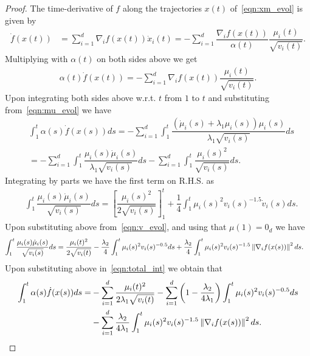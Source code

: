 \begin{proof}

The time-derivative of $f$ along the trajectories $x(t)$  of~\eqref{eqn:xm_evol} is given by
\begin{align*}
    \Dot{f}(x(t)) &= \sum_{i=1}^d \nabla_i f(x(t)) \Dot{x}_{i}(t) = - \sum_{i=1}^d \dfrac{\nabla_i f(x(t))}{\alpha(t)} \dfrac{\mu_i(t)}{\sqrt{v_i(t)}}.
\end{align*}
Multiplying with $\alpha(t)$ on both sides above we get
\begin{align*}
    \alpha(t)\Dot{f}(x(t)) = - \sum_{i=1}^d \nabla_i f(x(t)) \dfrac{\mu_i(t)}{\sqrt{v_i(t)}}.
\end{align*}
Upon integrating both sides above w.r.t. $t$ from $1$ to $t$ and substituting from~\eqref{eqn:mu_evol} we have
\begin{align}
    & \int_1^t \alpha(s)\Dot{f}(x(s))ds = - \sum_{i=1}^d \int_1^t \dfrac{(\Dot{\mu}_i(s) + \lambda_1 \mu_i(s)) \mu_i(s)}{\lambda_1 \sqrt{v_i(s)}}ds \nonumber\\
    &= - \sum_{i=1}^d \int_1^t \dfrac{\mu_i(s)\Dot{\mu}_i(s)}{\lambda_1 \sqrt{v_i(s)}}ds - \sum_{i=1}^d \int_1^t \dfrac{\mu_i(s)^2}{\sqrt{v_i(s)}}ds. \label{eqn:total_int}
\end{align}
Integrating by parts we have the first term on R.H.S. as
\begin{align*}
    & \int_1^t \dfrac{\mu_i(s)\Dot{\mu}_i(s)}{\sqrt{v_i(s)}}ds
    = \left[\dfrac{\mu_i(s)^2}{2\sqrt{v_i(s)}}\right]_1^t + \dfrac{1}{4} \int_1^t \mu_i(s)^2 v_i(s)^{-1.5} \Dot{v}_i(s) ds.
\end{align*}
Upon substituting above from~\eqref{eqn:v_evol}, and using that $\mu(1)=0_d$ we have
\begin{align*}
    \int_1^t \dfrac{\mu_i(s)\Dot{\mu}_i(s)}{\sqrt{v_i(s)}}ds
    &= \dfrac{\mu_i(t)^2}{2\sqrt{v_i(t)}} - \dfrac{\lambda_2}{4}\int_1^t \mu_i(s)^2 v_i(s)^{-0.5} ds + \dfrac{\lambda_2}{4}\int_1^t \mu_i(s)^2 v_i(s)^{-1.5} \left\lVert\nabla_i f(x(s))\right\rVert ^2 ds.
\end{align*}
Upon substituting above in~\eqref{eqn:total_int} we obtain that
\begin{align}
    \int_1^t \alpha(s)\Dot{f}(x(s))ds
    = & - \sum_{i=1}^d \dfrac{\mu_i(t)^2}{2\lambda_1\sqrt{v_i(t)}} - \sum_{i=1}^d \left(1-\dfrac{\lambda_2}{4\lambda_1}\right)\int_1^t \mu_i(s)^2 v_i(s)^{-0.5} ds \nonumber \\
    & - \sum_{i=1}^d \dfrac{\lambda_2}{4\lambda_1}\int_1^t \mu_i(s)^2 v_i(s)^{-1.5} \left\lVert\nabla_i f(x(s))\right\rVert ^2 ds. \label{eqn:int_expand}
\end{align}


\end{proof}
